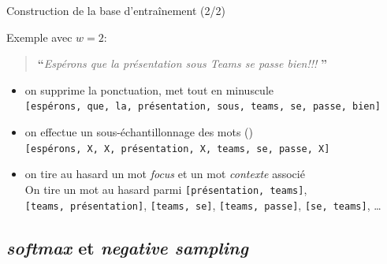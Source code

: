 \documentclass[10pt,xcolor=table,color={dvipsnames,usenames},ignorenonframetext,usepdftitle=false,french]{beamer}
\begin{document}
\begin{frame}[fragile]{Construction de la base d’entraînement (2/2)}
\protect\hypertarget{construction-de-la-base-dentrauxeenement-22}{}

Exemple avec \(w=2\):

\begin{quote}
\LARGE \textbf{``}\normalsize \emph{Espérons que la présentation sous Teams se passe bien!!!} \LARGE \textbf{''}\normalsize
\end{quote}

\begin{itemize}
\item
  on supprime la ponctuation, met tout en minuscule\\
  \faArrowCircleRight{}
  \texttt{{[}espérons,\ que,\ la,\ présentation,\ sous,\ teams,\ se,\ passe,\ bien{]}}
  \pause
\item
  on effectue un sous-échantillonnage des mots
  ()\\
  \faArrowCircleRight{}
  \texttt{{[}espérons,\ X,\ X,\ présentation,\ X,\ teams,\ se,\ passe,\ X{]}}
  \pause
\item
  on tire au hasard un mot \emph{focus} et un mot \emph{contexte}
  associé\\
  \faArrowCircleRight{} On tire un mot au hasard parmi
  \texttt{{[}présentation,\ teams{]}},
  \texttt{{[}teams,\ présentation{]}}, \texttt{{[}teams,\ se{]}},
  \texttt{{[}teams,\ passe{]}}, \texttt{{[}se,\ teams{]}}, \dots
\end{itemize}

\end{frame}

\hypertarget{softmax-et-negative-sampling}{%
\subsection{\texorpdfstring{\emph{softmax} et \emph{negative
sampling}}{softmax et negative sampling}}\label{softmax-et-negative-sampling}}
\end{document}
